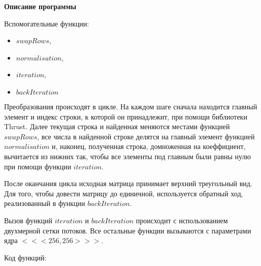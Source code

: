 \textbf{\large Описание программы}

Вспомогательные функции:
\begin{itemize}
    \setlength\itemsep{0.0em}
    \item $swapRows$, 
    \item $normalisation$,
    \item $iteration$,
    \item $backIteration$
\end{itemize}

Преобразования происходят в цикле. На каждом шаге сначала находится главный элемент и индекс строки, к которой он принадлежит, при помощи библиотеки Thrust. Далее текущая строка и найденная меняются местами функцией $swapRows$, все числа в найденной строке делятся на главный элемент функцией $normalisation$ и, наконец, полученная строка, домноженная на коеффициент, вычитается из нижних так, чтобы все элементы под главным были равны нулю при помощи функции $iteration$.

После оканчания цикла исходная матрица принимает верхний треугольный вид. Для того, чтобы довести матрицу до единичной, используется обратный ход, реализованный в функции $backIteration$.

Вызов функций $iteration$ и $backIteration$ происходит с использованием двухмерной сетки потоков. Все остальные функции вызываются с параметрами ядра $<<<256, 256>>>$.

Код функций:

